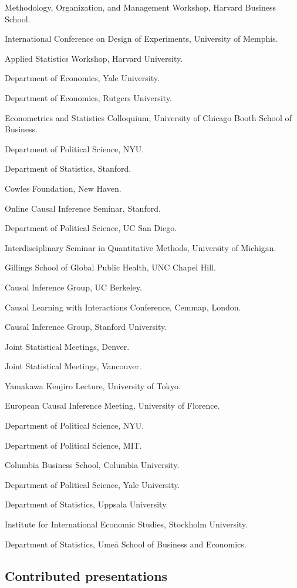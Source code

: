 \documentclass[10pt,letterpaper]{article}
\newenvironment{singledatelist}{
	\begin{list}{}{
		\setlength{\parskip}{0pt}
		\setlength{\itemsep}{4pt}
		\setlength{\parsep}{0.3em}
		\setlength{\leftmargin}{3.5em}
		\setlength{\labelwidth}{3.5em}
		\setlength{\labelsep}{1.5em}
		}
	}{
\end{list}
}
\newcommand{\dateitem}[2][]{\item[{#1}] {#2}}
\begin{document}
	\begin{singledatelist}
		\dateitem[2023]{Methodology, Organization, and Management Workshop, Harvard Business School.}
		\dateitem{International Conference on Design of Experiments, University of Memphis.}
		\dateitem{Applied Statistics Workshop, Harvard University.}
		\dateitem{Department of Economics, Yale University.}
		\dateitem[2021]{Department of Economics, Rutgers University.}
		\dateitem{Econometrics and Statistics Colloquium, University of Chicago Booth School of Business.}
		\dateitem{Department of Political Science, NYU.}
		\dateitem{Department of Statistics, Stanford.}
		\dateitem{Cowles Foundation, New Haven.}
		\dateitem{Online Causal Inference Seminar, Stanford.}
		\dateitem[2020]{Department of Political Science, UC San Diego.}
		\dateitem{Interdisciplinary Seminar in Quantitative Methods, University of Michigan.}
		\dateitem{Gillings School of Global Public Health, UNC Chapel Hill.}
		\dateitem{Causal Inference Group, UC Berkeley.}
		\dateitem[2019]{Causal Learning with Interactions Conference, Cemmap, London.}
		\dateitem{Causal Inference Group, Stanford University.}
		\dateitem{Joint Statistical Meetings, Denver.}
		\dateitem[2018]{Joint Statistical Meetings, Vancouver.}
		\dateitem{Yamakawa Kenjiro Lecture, University of Tokyo.}
		\dateitem{European Causal Inference Meeting, University of Florence.}
		\dateitem{Department of Political Science, NYU.}
		\dateitem{Department of Political Science, MIT.}
		\dateitem[2016]{Columbia Business School, Columbia University.}
		\dateitem[2015]{Department of Political Science, Yale University.}
		\dateitem{Department of Statistics, Uppsala University.}
		\dateitem{Institute for International Economic Studies, Stockholm University.}
		\dateitem[2013]{Department of Statistics, Umeå School of Business and Economics.}
	\end{singledatelist}


	\subsection*{Contributed presentations}
\end{document}

